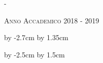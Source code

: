\begin{titlingpage}
\begin{adjustwidth*}{\unitlength}{-\unitlength}
\begin{center}
\begin{center}
\end{center}




\vspace{4.3cm}


\textsc{Anno Accademico 2018 - 2019}\\[0.2cm]


\end{center}

\end{adjustwidth*}


\advance\hsize by -2.7cm %
\advance\hoffset by 1.35cm %


\end{titlingpage}


\advance\vsize by -2.5cm %
\advance\voffset by 1.5cm %






